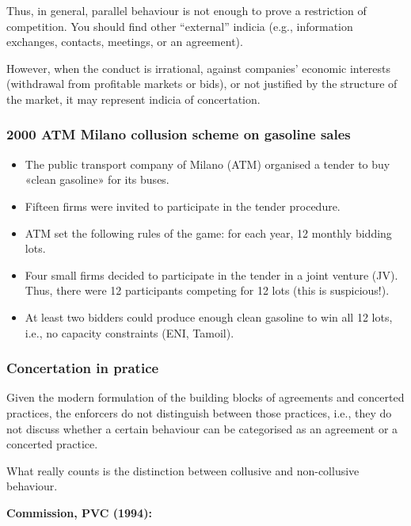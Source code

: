             Thus, in general, parallel behaviour is not enough to prove a restriction of competition. You should find other “external” indicia (e.g., information exchanges, contacts, meetings, or an agreement).
            
            However, when the conduct is irrational, against companies' economic interests (withdrawal from profitable markets or bids), or not justified by the structure of the market, it may represent indicia of concertation.

        \subsubsection{2000 ATM Milano collusion scheme on gasoline sales}

            \begin{itemize}
                \item The public transport company of Milano (ATM) organised a tender to buy «clean gasoline» for its buses. 
                \item Fifteen firms were invited to participate in the tender procedure.
                \item ATM set the following rules of the game: for each year, 12 monthly bidding lots.
                \item Four small firms decided to participate in the tender in a joint venture (JV). Thus, there were 12 participants competing for 12 lots (this is suspicious!).
                \item At least two bidders could produce enough clean gasoline to win all 12 lots, i.e., no capacity constraints (ENI, Tamoil).
            \end{itemize}

        \subsubsection{Concertation in pratice}

            Given the modern formulation of the building blocks of agreements and concerted practices, the enforcers do not distinguish between those practices, i.e., they do not discuss whether a certain behaviour can be categorised as an agreement or a concerted practice.

            \noindent What really counts is the distinction between collusive and non-collusive behaviour.
            
            \noindent \textbf{Commission, PVC (1994):}
            
